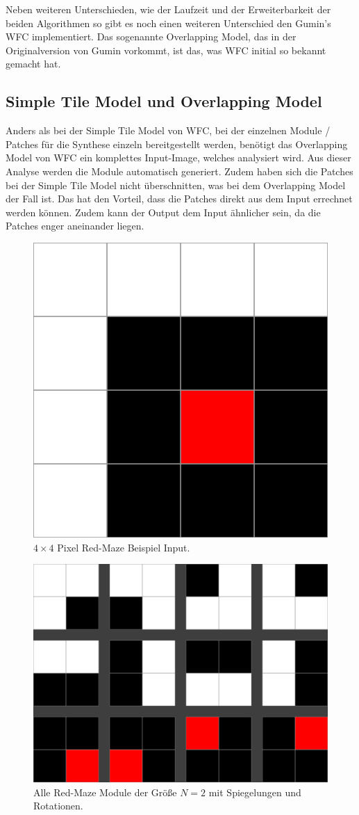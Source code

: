 \documentclass[12pt, a4paper,twoside,openright]{report} %
\begin{document}
Neben weiteren Unterschieden, wie der Laufzeit und der Erweiterbarkeit der beiden Algorithmen so gibt es noch einen weiteren Unterschied den Gumin's WFC implementiert.
Das sogenannte Overlapping Model, das in der Originalversion von Gumin vorkommt, ist das, was WFC initial so bekannt gemacht hat.

\subsection{Simple Tile Model und Overlapping Model}

Anders als bei der Simple Tile Model von WFC, bei der einzelnen Module / Patches für die Synthese einzeln bereitgestellt werden,
benötigt das Overlapping Model von WFC ein komplettes Input-Image, welches analysiert wird.
Aus dieser Analyse werden die Module automatisch generiert.
Zudem haben sich die Patches bei der Simple Tile Model nicht überschnitten, was bei dem Overlapping Model der Fall ist.
Das hat den Vorteil, dass die Patches direkt aus dem Input errechnet werden können.
Zudem kann der Output dem Input ähnlicher sein, da die Patches enger aneinander liegen. \cite{merrell2018compare}

\begin{figure}[H]
    \centering
    \includegraphics[width=0.5\linewidth]{images/red-maze.jpg}%
    \caption{$4\times 4$ Pixel Red-Maze Beispiel Input. \cite{Karth2017WaveFunctionCollapseIC}}%
\end{figure}


\begin{figure}[H]
    \centering
    \includegraphics[width=0.5\linewidth]{images/red-maze-modules.jpg}%
    \caption{Alle Red-Maze Module der Größe $N = 2$ mit Spiegelungen und Rotationen. \cite{Karth2017WaveFunctionCollapseIC}}%
\end{figure}
\end{document}
